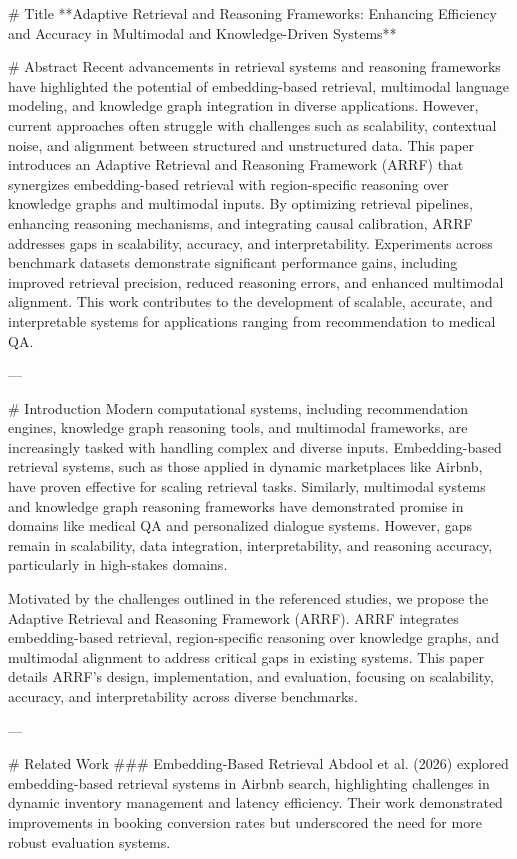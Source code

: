 # Title  
**Adaptive Retrieval and Reasoning Frameworks: Enhancing Efficiency and Accuracy in Multimodal and Knowledge-Driven Systems**

# Abstract  
Recent advancements in retrieval systems and reasoning frameworks have highlighted the potential of embedding-based retrieval, multimodal language modeling, and knowledge graph integration in diverse applications. However, current approaches often struggle with challenges such as scalability, contextual noise, and alignment between structured and unstructured data. This paper introduces an Adaptive Retrieval and Reasoning Framework (ARRF) that synergizes embedding-based retrieval with region-specific reasoning over knowledge graphs and multimodal inputs. By optimizing retrieval pipelines, enhancing reasoning mechanisms, and integrating causal calibration, ARRF addresses gaps in scalability, accuracy, and interpretability. Experiments across benchmark datasets demonstrate significant performance gains, including improved retrieval precision, reduced reasoning errors, and enhanced multimodal alignment. This work contributes to the development of scalable, accurate, and interpretable systems for applications ranging from recommendation to medical QA.

---

# Introduction  
Modern computational systems, including recommendation engines, knowledge graph reasoning tools, and multimodal frameworks, are increasingly tasked with handling complex and diverse inputs. Embedding-based retrieval systems, such as those applied in dynamic marketplaces like Airbnb, have proven effective for scaling retrieval tasks. Similarly, multimodal systems and knowledge graph reasoning frameworks have demonstrated promise in domains like medical QA and personalized dialogue systems. However, gaps remain in scalability, data integration, interpretability, and reasoning accuracy, particularly in high-stakes domains.

Motivated by the challenges outlined in the referenced studies, we propose the Adaptive Retrieval and Reasoning Framework (ARRF). ARRF integrates embedding-based retrieval, region-specific reasoning over knowledge graphs, and multimodal alignment to address critical gaps in existing systems. This paper details ARRF's design, implementation, and evaluation, focusing on scalability, accuracy, and interpretability across diverse benchmarks.

---

# Related Work  
### Embedding-Based Retrieval  
Abdool et al. (2026) explored embedding-based retrieval systems in Airbnb search, highlighting challenges in dynamic inventory management and latency efficiency. Their work demonstrated improvements in booking conversion rates but underscored the need for more robust evaluation systems.

